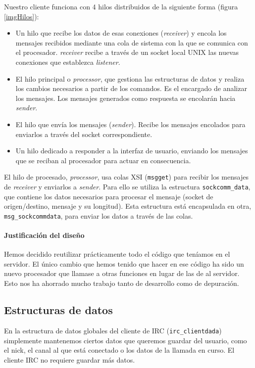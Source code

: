 \documentclass{article}
\begin{document}
Nuestro cliente funciona con 4 hilos distribuidos de la siguiente forma (figura \ref{imgHilos}):
\begin{itemize}
\item Un hilo que recibe los datos de esas conexiones (\emph{receiver}) y encola los mensajes recibidos mediante una cola de sistema con la que se comunica con el procesador. \textit{receiver} recibe a través de un socket local UNIX las nuevas conexiones que establezca \textit{listener}.
\item El hilo principal o \textit{processor}, que gestiona las estructuras de datos y realiza los cambios necesarios a partir de los comandos. Es el encargado de analizar los mensajes. Los mensajes generados como respuesta se encolarán hacia \textit{sender}.
\item El hilo que envía los mensajes (\emph{sender}). Recibe los mensajes encolados para enviarlos a través del socket correspondiente.
\item Un hilo dedicado a responder a la interfaz de usuario, enviando los mensajes que se reciban al procesador para actuar en consecuencia.
\end{itemize}

El hilo de procesado, \textit{processor}, usa colas XSI (\texttt{msgget}) para recibir los mensajes de \textit{receiver} y enviarlos a \textit{sender}. Para ello se utiliza la estructura \texttt{sockcomm\_data}, que contiene los datos necesarios para procesar el mensaje (socket de origen/destino, mensaje y su longitud). Esta estructura está encapsulada en otra, \texttt{msg\_sockcommdata}, para enviar los datos a través de las colas.

\paragraph{Justificación del diseño} Hemos decidido reutilizar prácticamente todo el código que teníamos en el servidor. El único cambio que hemos tenido que hacer en ese código ha sido un nuevo procesador que llamase a otras funciones en lugar de las de al servidor. Esto nos ha ahorrado mucho trabajo tanto de desarrollo como de depuración.

\subsection{Estructuras de datos}

En la estructura de datos globales del cliente de IRC (\texttt{irc\_clientdada}) simplemente mantenemos ciertos datos que queremos guardar del usuario, como el nick, el canal al que está conectado o los datos de la llamada en curso. El cliente IRC no requiere guardar más datos.
\end{document}
